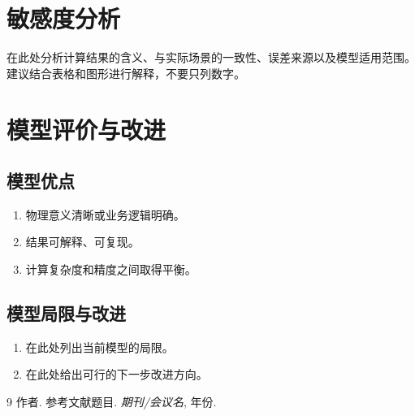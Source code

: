 \documentclass[12pt,a4paper]{article}
\newcommand{\bibfont}{\fontsize{10.6pt}{15pt}\selectfont}
\begin{document}
\section{敏感度分析}


在此处分析计算结果的含义、与实际场景的一致性、误差来源以及模型适用范围。建议结合表格和图形进行解释，不要只列数字。

\section{模型评价与改进}

\subsection{模型优点}

\begin{enumerate}
    \item 物理意义清晰或业务逻辑明确。
    \item 结果可解释、可复现。
    \item 计算复杂度和精度之间取得平衡。
\end{enumerate}

\subsection{模型局限与改进}

\begin{enumerate}
    \item 在此处列出当前模型的局限。
    \item 在此处给出可行的下一步改进方向。
\end{enumerate}

\renewcommand{\refname}{{\heiti 八、}参考文献}
\begingroup
\bibfont
\begin{thebibliography}{9}
    作者. 参考文献题目. \textit{期刊/会议名}, 年份.
\end{thebibliography}
\endgroup
\label{body:end}
\end{document}
